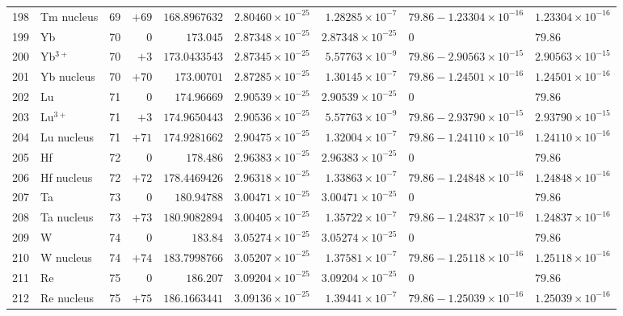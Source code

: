 {\begin{tabular}{@{}r l r r r r r l l@{}}
198 & Tm nucleus & 69 & $+69$ & $168.8967632$ & $2.80460{\times}10^{-25}$ & $1.28285{\times}10^{-7}$ & $79.86 - 1.23304{\times}10^{-16}$ & $1.23304{\times}10^{-16}$ \\
199 & Yb & 70 & $0$ & $173.045$ & $2.87348{\times}10^{-25}$ & $2.87348{\times}10^{-25}$ & $0$ & $79.86$ \\
200 & Yb$^{3+}$ & 70 & $+3$ & $173.0433543$ & $2.87345{\times}10^{-25}$ & $5.57763{\times}10^{-9}$ & $79.86 - 2.90563{\times}10^{-15}$ & $2.90563{\times}10^{-15}$ \\
201 & Yb nucleus & 70 & $+70$ & $173.00701$ & $2.87285{\times}10^{-25}$ & $1.30145{\times}10^{-7}$ & $79.86 - 1.24501{\times}10^{-16}$ & $1.24501{\times}10^{-16}$ \\
202 & Lu & 71 & $0$ & $174.96669$ & $2.90539{\times}10^{-25}$ & $2.90539{\times}10^{-25}$ & $0$ & $79.86$ \\
203 & Lu$^{3+}$ & 71 & $+3$ & $174.9650443$ & $2.90536{\times}10^{-25}$ & $5.57763{\times}10^{-9}$ & $79.86 - 2.93790{\times}10^{-15}$ & $2.93790{\times}10^{-15}$ \\
204 & Lu nucleus & 71 & $+71$ & $174.9281662$ & $2.90475{\times}10^{-25}$ & $1.32004{\times}10^{-7}$ & $79.86 - 1.24110{\times}10^{-16}$ & $1.24110{\times}10^{-16}$ \\
205 & Hf & 72 & $0$ & $178.486$ & $2.96383{\times}10^{-25}$ & $2.96383{\times}10^{-25}$ & $0$ & $79.86$ \\
206 & Hf nucleus & 72 & $+72$ & $178.4469426$ & $2.96318{\times}10^{-25}$ & $1.33863{\times}10^{-7}$ & $79.86 - 1.24848{\times}10^{-16}$ & $1.24848{\times}10^{-16}$ \\
207 & Ta & 73 & $0$ & $180.94788$ & $3.00471{\times}10^{-25}$ & $3.00471{\times}10^{-25}$ & $0$ & $79.86$ \\
208 & Ta nucleus & 73 & $+73$ & $180.9082894$ & $3.00405{\times}10^{-25}$ & $1.35722{\times}10^{-7}$ & $79.86 - 1.24837{\times}10^{-16}$ & $1.24837{\times}10^{-16}$ \\
209 & W & 74 & $0$ & $183.84$ & $3.05274{\times}10^{-25}$ & $3.05274{\times}10^{-25}$ & $0$ & $79.86$ \\
210 & W nucleus & 74 & $+74$ & $183.7998766$ & $3.05207{\times}10^{-25}$ & $1.37581{\times}10^{-7}$ & $79.86 - 1.25118{\times}10^{-16}$ & $1.25118{\times}10^{-16}$ \\
211 & Re & 75 & $0$ & $186.207$ & $3.09204{\times}10^{-25}$ & $3.09204{\times}10^{-25}$ & $0$ & $79.86$ \\
212 & Re nucleus & 75 & $+75$ & $186.1663441$ & $3.09136{\times}10^{-25}$ & $1.39441{\times}10^{-7}$ & $79.86 - 1.25039{\times}10^{-16}$ & $1.25039{\times}10^{-16}$ \\

\end{tabular}}

